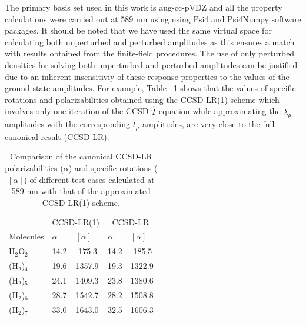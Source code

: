 The primary basis set used in this work is aug-cc-pVDZ\cite{Dunning89,Kendall92,Woon94}
and all the property calculations were carried out at 589 nm using 
using Psi4 and Psi4Numpy software packages.\cite{Parrish17, Smith18}
It should be noted that we have used the same virtual space for calculating both unperturbed
and perturbed amplitudes as this ensures a match with results obtained from
the finite-field procedures. The use of only perturbed densities for solving 
both unperturbed and perturbed amplitudes can be justified due to an inherent
insensitiviy of these response properties to the values of the ground state amplitudes.
For example, Table ~\ref{cclr_justify} shows that the values of specific rotations and polarizabilities 
obtained using the CCSD-LR(1) scheme which involves only one iteration of the CCSD $\hat{T}$ equation while 
approximating the $\lambda_\mu$ amplitudes with the corresponding $t_\mu$ amplitudes, are very close to 
the full canonical result (CCSD-LR).
 \begin{table}[h]
 \caption{{\footnotesize Comparison of the canonical CCSD-LR polarizabilities ($\alpha$) and specific rotations ($[\alpha]$) of different test cases 
calculated at 589 nm with that of the approximated CCSD-LR(1) scheme.}}
\centering
\begin{tabular}{lllll}
\hline
 & \multicolumn{2}{c}{CCSD-LR(1)} & \multicolumn{2}{c}{CCSD-LR} \\
\cline{2-5}
 Molecules & $\alpha$ & $[\alpha]$ & $\alpha$ & $[\alpha]$ \\ %
\hline
H$_2$O$_2$  & 14.2 & -175.3 &  14.2 &  -185.5   \\
\hline
(H$_2$)$_4$ & 19.6 & 1357.9 &  19.3 &  1322.9 \\
\hline
(H$_2$)$_5$ & 24.1  & 1409.3 & 23.8 &  1380.6  \\
\hline
(H$_2$)$_6$ & 28.7 & 1542.7 & 28.2 &   1508.8 \\
\hline
(H$_2$)$_7$ & 33.0 & 1643.0 & 32.5 &   1606.3  \\
\hline
\\
\end{tabular}
\label{cclr_justify}
\end{table}
